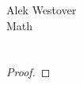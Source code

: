 \documentclass{article}[11pt]
\begin{document}
\begin{center}
\begin{Large}
	Alek Westover \\
	\vspace{2mm}
	Math 
\end{Large}
\end{center}
\thispagestyle{empty}

\section{}
\subsection{}
\begin{proof}
	
\end{proof}
\end{document}
